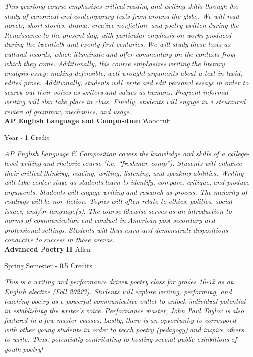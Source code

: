 \vspace{1mm}\emph{This yearlong course emphasizes critical reading and writing skills through the study of canonical and contemporary texts from around the globe. We will read novels, short stories, drama, creative nonfiction, and poetry written during the Renaissance to the present day, with particular emphasis on works produced during the twentieth and twenty-first centuries. We will study these texts as cultural records, which illuminate and offer commentary on the contexts from which they come. Additionally, this course emphasizes writing the literary analysis essay; making defensible, well-wrought arguments about a text in lucid, edited prose. Additionally, students will write and edit personal essays in order to search out their voices as writers and values as humans. Frequent informal writing will also take place in class. Finally, students will engage in a structured review of grammar, mechanics, and usage. }\\


\noindent\textbf{AP English Language and Composition} \hfill Woodruff

\noindent Year - 1 Credit

\vspace{1mm}\emph{AP English Language \& Composition covers the knowledge and skills of a college-level writing and rhetoric course (i.e. “freshman comp”). Students will enhance their critical thinking, reading, writing, listening, and speaking abilities. Writing will take center stage as students learn to identify, compare, critique, and produce arguments. Students will engage writing and research as process. The majority of readings will be non-fiction. Topics will often relate to ethics, politics, social issues, and/or language(s). The course likewise serves as an introduction to norms of communication and conduct in American post-secondary and professional settings. Students will thus learn and demonstrate dispositions conducive to success in those arenas.}\\


\noindent\textbf{Advanced Poetry II} \hfill Allen

\noindent Spring Semester - 0.5 Credits

\vspace{1mm}\emph{This is a writing and performance driven poetry class for grades 10-12 as an English elective (Fall 20223). Students will explore writing, performing, and teaching poetry as a powerful communicative outlet to unlock individual potential in establishing the writer’s voice. Performance master, John Paul Taylor is also featured in a few master classes. Lastly, there is an opportunity to correspond with other young students in order to teach poetry (pedagogy) and inspire others to write. Thus, potentially contributing to hosting several public exhibitions of youth poetry!}\\


